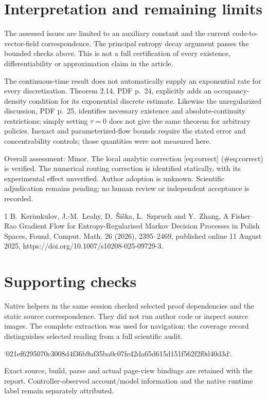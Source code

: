 \documentclass[10pt]{article}
\begin{document}
\section*{Interpretation and remaining limits}
The assessed issues are limited to an auxiliary constant and the current code-to-vector-field correspondence. The principal entropy decay argument passes the bounded checks above. This is not a full certification of every existence, differentiability or approximation claim in the article.\par
The continuous-time result does not automatically supply an exponential rate for every discretization. Theorem 2.14, PDF p. 24, explicitly adds an occupancy-density condition for its exponential discrete estimate. Likewise the unregularized discussion, PDF p. 25, identifies necessary existence and absolute-continuity restrictions; simply setting \(\tau=0\) does not give the same theorem for arbitrary policies. Inexact and parameterized-flow bounds require the stated error and concentrability controls; those quantities were not measured here.\par
Overall assessment: Minor. The local analytic correction [eq:correct] (\#eq:correct) is verified. The numerical routing correction is identified statically, with its experimental effect unverified. Author adoption is unknown. Scientific adjudication remains pending; no human review or independent acceptance is recorded.\par
1 B. Kerimkulov, J.-M. Leahy, D. Šiška, L. Szpruch and Y. Zhang, A Fisher–Rao Gradient Flow for Entropy-Regularised Markov Decision Processes in Polish Spaces, Found. Comput. Math. 26 (2026), 2395–2469, published online 11 August 2025, https://doi.org/10.1007/s10208-025-09729-3.\par
\section*{Supporting checks}
Native helpers in the same session checked selected proof dependencies and the static source correspondence. They did not run author code or inspect source images. The complete extraction was used for navigation; the coverage record distinguishes selected reading from a full scientific audit.\par
`021ef6295070c3008d4f36b9af35ba0c07fe42da65d615d151f562f2f0d40d3d`.\par
Exact source, build, parse and actual page-view bindings are retained with the report. Controller-observed account/model information and the native runtime label remain separately attributed.\par
\end{document}
